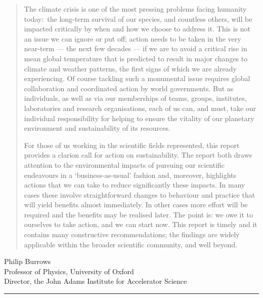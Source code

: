 \documentclass[../SustainableHEP.tex]{subfiles}
\begin{document}
\begin{quotation}
The climate crisis is one of the most pressing problems facing humanity today:\ the long-term survival of our species, and countless others, will be impacted critically by when and how we choose to address it. This is not an issue we can ignore or put off; action needs to be taken in the very near-term --- the next few decades --- if we are to avoid a critical rise in mean global temperature that is predicted to result in major changes to climate and weather patterns, the first signs of which we are already experiencing. Of course tackling such a monumental issue requires global collaboration and coordinated action by world governments.  But as individuals, as well as via our memberships of teams, groups, institutes, laboratories and research organisations, each of us can, and must, take our individual responsibility for helping to ensure the vitality of our planetary environment and sustainability of its resources.

For those of us working in the scientific fields represented, this report provides a clarion call for action on sustainability. The report both draws attention to the environmental impacts of pursuing our scientific endeavours in a ‘business-as-usual’ fashion and, moreover, highlights actions that we can take to reduce significantly these impacts. In many cases these involve straightforward changes to behaviour and practice that will yield benefits almost immediately. In other cases more effort will be required and the benefits may be realised later. The point is: we owe it to ourselves to take action, and we can start now. This report is timely and it contains many constructive recommendations; the findings are widely applicable within the broader scientific community, and well beyond.
\end{quotation}
\begin{flushleft}
Philip Burrows \\
Professor of Physics, University of Oxford\\
Director, the John Adams Institute for Accelerator Science
\end{flushleft}

\textcolor{Pythongreen}{\rule{2cm}{3pt}}
\end{document}
